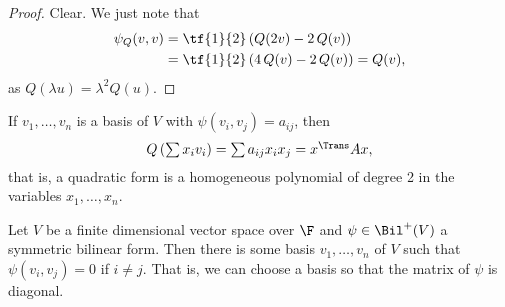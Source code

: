 \begin{proof}
	Clear. We just note that %
	\begin{align*}
		\psi_Q(v,v)
		&= \tf{1}{2}\left( Q(2v) - 2\,Q(v) \right) \\
		&= \tf{1}{2}\left( 4\,Q(v) - 2\,Q(v) \right) = Q(v),
	\end{align*}
	as $Q(\lambda u) = \lambda^2 Q(u)$.
\end{proof}

\vspace{3pt}

\begin{remark}
	If $v_1,\ldots,v_n$ is a basis of $V$ with $\psi(v_i,v_j) = a_{ij}$, then
	\begin{equation*}
		\textstyle Q\left( \sum x_i v_i \right) = \sum a_{ij} x_i x_j = x^\Trans Ax, %
	\end{equation*}
	that is, a quadratic form is a homogeneous polynomial of degree 2 in the variables $x_1,\ldots,x_n$. %
\end{remark}

\begin{theorem}
	Let $V$ be a finite dimensional vector space over $\F$ and $\psi\in\Bil^+(V)$ a symmetric bilinear form. Then there is some basis $v_1,\ldots,v_n$ of $V$ such that $\psi(v_i,v_j)=0$ if $i\neq j$. That is, we can choose a basis so that the matrix of $\psi$ is diagonal. %
\end{theorem}

